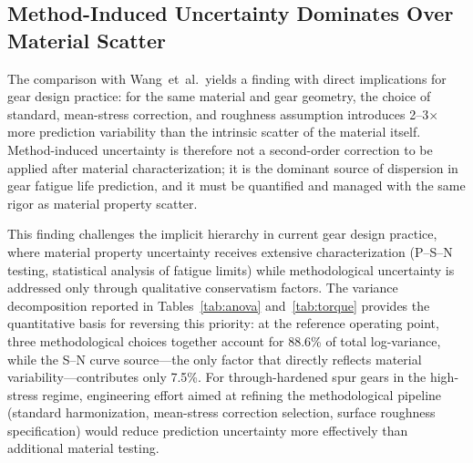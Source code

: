 \documentclass[12pt,a4paper]{article}
\begin{document}
\subsection{Method-Induced Uncertainty Dominates Over Material Scatter}
\label{sec:method_dominates}

The comparison with Wang~et~al.\ yields a finding with direct
implications for gear design practice: for the same material and gear
geometry, the choice of standard, mean-stress correction, and roughness
assumption introduces 2--3$\times$ more prediction variability than
the intrinsic scatter of the material itself. Method-induced
uncertainty is therefore not a second-order correction to be applied
after material characterization; it is the dominant source of
dispersion in gear fatigue life prediction, and it must be quantified
and managed with the same rigor as material property scatter.

This finding challenges the implicit hierarchy in current gear design
practice, where material property uncertainty receives extensive
characterization (P--S--N testing, statistical analysis of fatigue
limits) while methodological uncertainty is addressed only through
qualitative conservatism factors. The variance decomposition reported
in Tables~\ref{tab:anova} and~\ref{tab:torque} provides the
quantitative basis for reversing this priority: at the reference
operating point, three methodological choices together account for
88.6\% of total log-variance, while the S--N curve source---the only
factor that directly reflects material variability---contributes only
7.5\%. For through-hardened spur gears in the high-stress regime,
engineering effort aimed at refining the methodological pipeline
(standard harmonization, mean-stress correction selection, surface
roughness specification) would reduce prediction uncertainty more
effectively than additional material testing.
\end{document}
